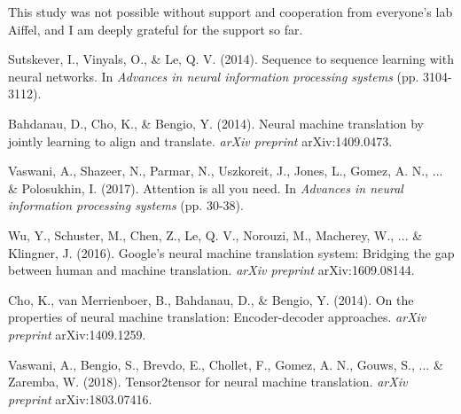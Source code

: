 \documentclass{article}
\begin{document}
This study was not possible without support and cooperation from everyone's lab Aiffel, and I am deeply grateful for the support so far.

\begin{thebibliography}{9}

Sutskever, I., Vinyals, O., \& Le, Q. V. (2014). Sequence to sequence learning with neural networks. In \textit{Advances in neural information processing systems} (pp. 3104-3112).

Bahdanau, D., Cho, K., \& Bengio, Y. (2014). Neural machine translation by jointly learning to align and translate. \textit{arXiv preprint} arXiv:1409.0473.

Vaswani, A., Shazeer, N., Parmar, N., Uszkoreit, J., Jones, L., Gomez, A. N., ... \& Polosukhin, I. (2017). Attention is all you need. In \textit{Advances in neural information processing systems} (pp. 30-38).

Wu, Y., Schuster, M., Chen, Z., Le, Q. V., Norouzi, M., Macherey, W., ... \& Klingner, J. (2016). Google's neural machine translation system: Bridging the gap between human and machine translation. \textit{arXiv preprint} arXiv:1609.08144.

Cho, K., van Merrienboer, B., Bahdanau, D., \& Bengio, Y. (2014). On the properties of neural machine translation: Encoder-decoder approaches. \textit{arXiv preprint} arXiv:1409.1259.

Vaswani, A., Bengio, S., Brevdo, E., Chollet, F., Gomez, A. N., Gouws, S., ... \& Zaremba, W. (2018). Tensor2tensor for neural machine translation. \textit{arXiv preprint} arXiv:1803.07416.

\end{thebibliography}
\end{document}
